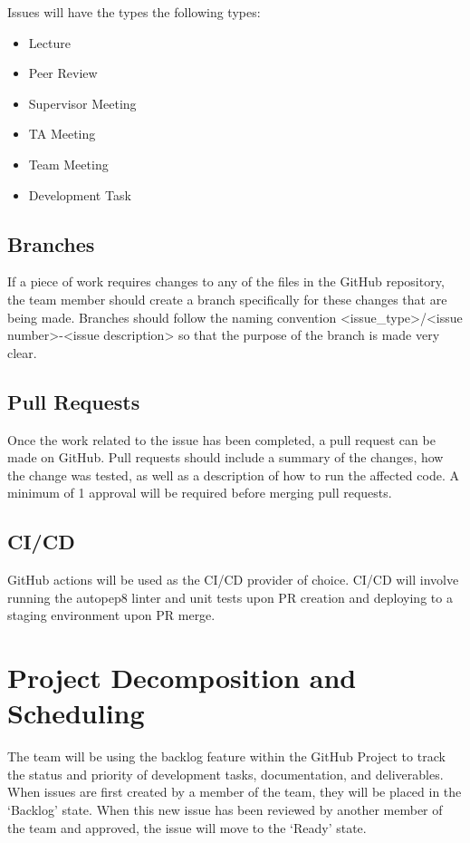 \documentclass{article}
\begin{document}
Issues will have the types the following types:
\begin{itemize}
    \item Lecture
    \item Peer Review
    \item Supervisor Meeting
    \item TA Meeting
    \item Team Meeting
    \item Development Task
\end{itemize}

\subsection*{Branches}
If a piece of work requires changes to any of the files in the GitHub repository, the team member should create a branch specifically for these changes that are being made. Branches should follow the naming convention <issue\_type>/<issue number>-<issue description> so that the purpose of the branch is made very clear. 

\subsection*{Pull Requests}
Once the work related to the issue has been completed, a pull request can be made on GitHub. Pull requests should include a summary of the changes, how the change was tested, as well as a description of how to run the affected code. A minimum of 1 approval will be required before merging pull requests. 

\subsection*{CI/CD}
GitHub actions will be used as the CI/CD provider of choice. CI/CD will involve running the autopep8 linter and unit tests upon PR creation and deploying to a staging environment upon PR merge. 

\section{Project Decomposition and Scheduling}

\maketitle

The team will be using the backlog feature within the GitHub Project to track the status and priority of development tasks, documentation, and deliverables. When issues are first created by a member of the team, they will be placed in the ‘Backlog’ state. When this new issue has been reviewed by another member of the team and approved, the issue will move to the ‘Ready’ state. 
\end{document}
